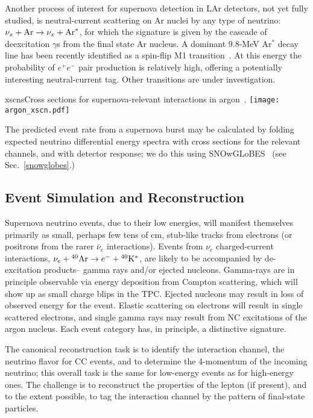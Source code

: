 Another process of interest for supernova detection in LAr detectors,
not yet fully studied,  is neutral-current  scattering on Ar nuclei by
any type of neutrino: $\nu_x + {\rm Ar} \rightarrow \nu_x + {\rm
  Ar}^*$,  for which the signature is given by the cascade of
deexcitation $\gamma$s from the final state Ar nucleus.  A dominant
9.8-MeV Ar$^*$ decay line has been recently identified as a spin-flip
M1 transition~\cite{Hayes}.   At this energy the probability of
$e^+e^-$ pair production is relatively high, offering a potentially
interesting neutral-current tag.  Other transitions are under investigation.


\begin{dunefigure}{xscns}{Cross sections for supernova-relevant interactions in argon~\cite{GilBotella:2003sz,snowglobes}.}
\texttt{[image: argon\_xscn.pdf]}
\end{dunefigure}

The predicted event rate from a supernova burst may be calculated by
folding expected neutrino differential energy spectra with cross
sections for the relevant channels, and with detector response; we do
this using SNOwGLoBES~\cite{snowglobes} (see Sec.~\ref{snowglobes}.)


\subsection{Event Simulation and Reconstruction}

Supernova neutrino events, due to their low energies, will manifest
themselves primarily as small, perhaps few tens of cm, stub-like tracks from
electrons (or positrons from the rarer $\bar{\nu}_e$ interactions).
Events from $\nu_e $ charged-current interactions, $\nu_e+{}^{40}{\rm
  Ar}\rightarrow e^{-}+{}^{40}{\rm K}^{*}$, are likely to be
accompanied by de-excitation products-- gamma rays and/or ejected
nucleons. Gamma-rays are in principle observable via energy deposition
from Compton scattering, which will show up as small charge blips in
the TPC.  
Ejected nucleons may result in loss of observed energy for
the event.  Elastic scattering on electrons will result in single
scattered electrons, and single gamma rays may result from NC
excitations of the argon nucleus.   Each event category has, in principle, a
distinctive signature.

The canonical reconstruction task is to identify the interaction
channel, the neutrino flavor for CC events, and to determine the
4-momentum of the incoming neutrino; this overall task is the same for
low-energy events as for high-energy ones.  The challenge is to
reconstruct the properties of the lepton (if present), and to the extent
possible, to tag the interaction channel by the pattern of final-state
particles.


